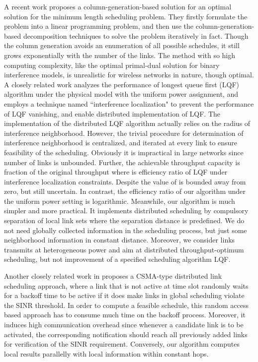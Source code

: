 \documentclass[journal]{IEEEtran}
\begin{document}
\indent A recent work \cite{S:phy16} proposes a column-generation-based solution for an optimal solution for the minimum length scheduling problem. They firstly formulate the problem into a linear programming problem, and then use the column-generation-based decomposition techniques to solve the problem iteratively in fact. Though the column generation avoids an enumeration of all possible schedules, it still grows exponentially with the number of the links. The method with so high computing complexity, like the optimal primal-dual solution for binary interference models, is unrealistic for wireless networks in nature, though optimal.\\
\indent A closely related work \cite{S:phy7} analyzes the performance of longest queue first (LQF) algorithm under the physical model with the uniform power assignment, and employs a technique named ``interference localization" to prevent the performance of LQF vanishing, and enable distributed implementation of LQF. The implementation of the distributed LQF algorithm actually relies on the radius of interference neighborhood.  However, the trivial procedure for determination of interference neighborhood is centralized, and iterated at every link to ensure feasibility of the scheduling. Obviously it is impractical in large networks since number of links is unbounded. Further, the achievable throughput capacity is  fraction of the original throughput where  is efficiency ratio of LQF under interference localization constraints. Despite the value of   is bounded away from zero, but still uncertain. In contrast, the efficiency ratio of our algorithm under the uniform power setting is logarithmic. Meanwhile, our algorithm is much simpler and more practical. It implements distributed scheduling by compulsory separation of local link sets where the separation distance is predefined.  We do not need globally collected information  in the scheduling process, but just some neighborhood information in constant distance.
 Moreover, we consider links transmits at heterogeneous power and aim at distributed throughput-optimum scheduling, but not improvement of a specified scheduling algorithm LQF.

 Another closely related work in \cite{S:dphy1} proposes a CSMA-type distributed link scheduling approach, where a link that is not active at time slot  randomly waits for a backoff time to be active if it does make links in global scheduling  violate the SINR threshold. In order to compute a feasible schedule, this random access based approach has to consume much time on the backoff process. Moreover, it induces high communication overhead since whenever a candidate link is to be activated, the corresponding notification should reach all previously added links for verification of the SINR requirement. Conversely, our algorithm computes local results parallelly with local information within constant hops.
\end{document}
